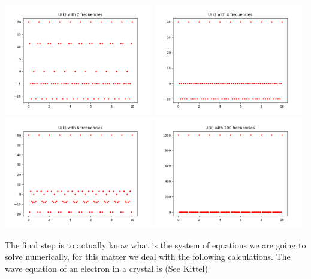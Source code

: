 \begin{questions}
\begin{solution}
\begin{center}
  \includegraphics[width=65mm]{uk2}
  \includegraphics[width=65mm]{uk4}
  \includegraphics[width=65mm]{uk6}
  \includegraphics[width=65mm]{uk100}
\end{center}

\label{fig:four}\vspace{0.5cm}

The final step is to actually know what is the system of equations we are going to solve numerically, for this matter we deal with the following calculations. The wave equation of an electron in a crystal is (See Kittel)


\end{solution}
\end{questions}
